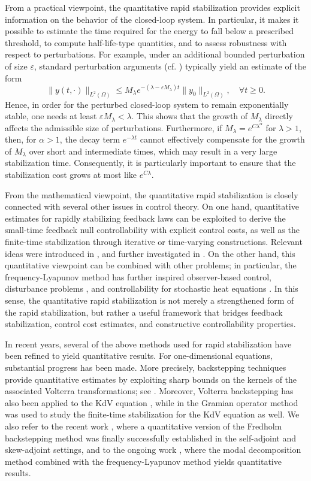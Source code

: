 \documentclass[a4paper]{article}
\numberwithin{equation}{section}
\begin{document}
From a practical viewpoint, the quantitative rapid stabilization provides explicit information on the behavior of the closed-loop system. In particular, it makes it possible to estimate the time required for the energy to fall below a prescribed threshold, to compute half-life-type quantities, and to assess robustness with respect to perturbations. For example, under an additional bounded perturbation of size $\varepsilon$, standard perturbation arguments (cf. \cite{TW}) typically yield an estimate of the form
$$\|y(t,\cdot)\|_{L^2(\Omega)}\le M_\lambda e^{-(\lambda-\varepsilon M_\lambda)t}\|y_0\|_{L^2(\Omega)}, \quad\forall t\ge 0.$$
Hence, in order for the perturbed closed-loop system to remain exponentially stable, one needs at least $\varepsilon M_\lambda<\lambda$. This shows that the growth of $M_\lambda$ directly affects the admissible size of perturbations. Furthermore, if $M_\lambda=e^{C\lambda^\alpha}$ for $\lambda>1$, then, for $\alpha>1$, the decay term $e^{-\lambda t}$ cannot effectively compensate for the growth of $M_\lambda$ over short and intermediate times, which may result in a very large stabilization time. Consequently, it is particularly important to ensure that the stabilization cost grows at most like $e^{C\lambda}$. 

From the mathematical viewpoint, the quantitative rapid stabilization is closely connected with several other issues in control theory. On one hand, quantitative estimates for rapidly stabilizing feedback laws can be exploited to derive the small-time feedback null controllability with explicit control costs, as well as the finite-time stabilization through iterative or time-varying constructions. Relevant ideas were introduced in \cite{CN}, and further investigated in \cite{X0,X2}. On the other hand, this quantitative viewpoint can be combined with other problems; in particular, the frequency-Lyapunov method \cite{X2} has further inspired observer-based control, disturbance problems \cite{GPC}, and controllability for stochastic heat equations \cite{HLP}. In this sense, the quantitative rapid stabilization is not merely a strengthened form of the rapid stabilization, but rather a useful framework that bridges feedback stabilization, control cost estimates, and constructive controllability properties.

In recent years, several of the above methods used for rapid stabilization have been refined to yield quantitative results. For one-dimensional equations, substantial progress has been made. More precisely, backstepping techniques provide quantitative estimates by exploiting sharp bounds on the kernels of the associated Volterra transformations; see \cite{CN}. Moreover, Volterra backstepping has also been applied to the KdV equation \cite{X0}, while in \cite{Nyu} the Gramian operator method was used to study the finite-time stabilization for the KdV equation as well. We also refer to the recent work \cite{GHMXZ}, where a quantitative version of the Fredholm backstepping method was finally successfully established in the self-adjoint and skew-adjoint settings, and to the ongoing work \cite{XXZ}, where the modal decomposition method combined with the frequency-Lyapunov method yields quantitative results.\\[-2mm]
\end{document}
